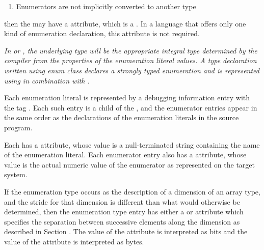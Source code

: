 {\begin{enumerate}[1. ]
\item Enumerators are not implicitly converted to another type
\end{enumerate}

then the  may 
have a \DWATenumclassDEFN{}
attribute, which is a . 
In a language that offers only
one kind of enumeration declaration, this attribute is not
required.

\textit{In  or , 
the underlying type will be the appropriate
integral type determined by the compiler from the properties 
of\hypertarget{chap:DWATenumclasstypesafeenumerationdefinition}{}
the enumeration literal values. 
A  type declaration written
using enum class declares a strongly typed enumeration and
is represented using \DWTAGenumerationtype{} 
in combination with \DWATenumclass.}

Each enumeration literal is represented by a debugging
information entry with the 
tag \DWTAGenumeratorTARG. 
Each
such entry is a child of the 
, and the
enumerator entries appear in the same order as the declarations
of the enumeration literals in the source program.

Each  has a \DWATname{} attribute, whose
value is a null-terminated string containing the name of 
the\hypertarget{chap:DWATconstvalueenumerationliteralvalue}{}
enumeration literal.
Each enumerator entry also has a 
\DWATconstvalueDEFN{} attribute,
whose value is the actual numeric value of the enumerator as
represented on the target system.

If the enumeration type occurs as the description of a
dimension of an array type, and the stride for that 
dimension\hypertarget{chap:DWATbytestrideenumerationstridedimensionofarraytype}{}
is different than what would otherwise be determined, 
then\hypertarget{chap:DWATbitstrideenumerationstridedimensionofarraytype}{}
the enumeration type entry has either a
\DWATbytestrideDEFN{} or
\DWATbitstrideDEFN{} attribute which specifies the separation
between successive elements along the dimension as described
in Section . 
The value of the \DWATbitstride{} attribute
is interpreted as bits and 
the value of the \DWATbytestride{} attribute is interpreted 
as bytes.

}
